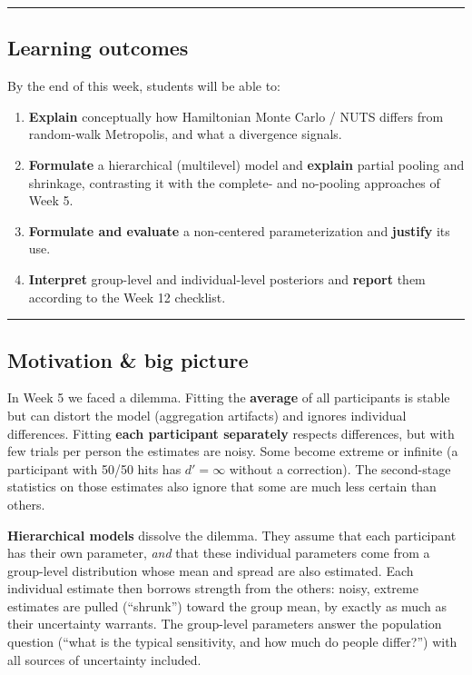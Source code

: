 \begin{center}\rule{0.5\linewidth}{0.5pt}\end{center}

\subsection{Learning outcomes}

By the end of this week, students will be able to:

\begin{enumerate}
\def\labelenumi{\arabic{enumi}.}
\tightlist
\item
  \textbf{Explain} conceptually how Hamiltonian Monte Carlo / NUTS
  differs from random-walk Metropolis, and what a divergence signals.
\item
  \textbf{Formulate} a hierarchical (multilevel) model and
  \textbf{explain} partial pooling and shrinkage, contrasting it with
  the complete- and no-pooling approaches of Week 5.
\item
  \textbf{Formulate and evaluate} a non-centered parameterization and
  \textbf{justify} its use.
\item
  \textbf{Interpret} group-level and individual-level posteriors and
  \textbf{report} them according to the Week 12 checklist.
\end{enumerate}

\begin{center}\rule{0.5\linewidth}{0.5pt}\end{center}

\subsection{Motivation \& big picture}

In Week 5 we faced a dilemma. Fitting the \textbf{average} of all
participants is stable but can distort the model (aggregation artifacts)
and ignores individual differences. Fitting \textbf{each participant
separately} respects differences, but with few trials per person the
estimates are noisy. Some become extreme or infinite (a participant with
50/50 hits has \(d' = \infty\) without a correction). The second-stage
statistics on those estimates also ignore that some are much less
certain than others.

\textbf{Hierarchical models} dissolve the dilemma. They assume that each
participant has their own parameter, \emph{and} that these individual
parameters come from a group-level distribution whose mean and spread
are also estimated. Each individual estimate then borrows strength from
the others: noisy, extreme estimates are pulled (``shrunk'') toward the
group mean, by exactly as much as their uncertainty warrants. The
group-level parameters answer the population question (``what is the
typical sensitivity, and how much do people differ?'') with all sources
of uncertainty included.

